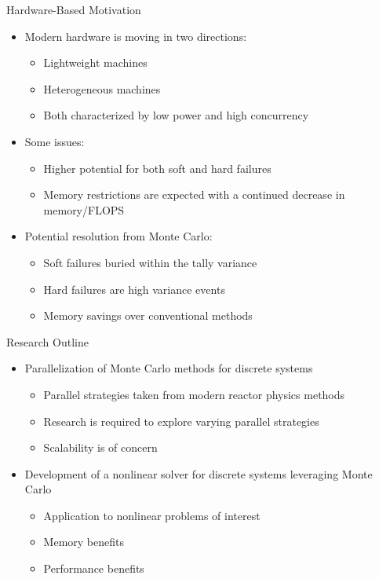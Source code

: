 \documentclass{beamer}
\begin{document}
\begin{frame}{Hardware-Based Motivation}

  \begin{itemize}
  \item Modern hardware is moving in two directions:
    \begin{itemize}
    \item Lightweight machines
    \item Heterogeneous machines
    \item Both characterized by low power and high concurrency
    \end{itemize}
  \item Some issues:
    \begin{itemize}
    \item Higher potential for both soft and hard failures
    \item Memory restrictions are expected with a continued decrease
      in memory/FLOPS
    \end{itemize}
  \item Potential resolution from Monte Carlo:
    \begin{itemize}
    \item Soft failures buried within the tally variance
    \item Hard failures are high variance events
    \item Memory savings over conventional methods
    \end{itemize}
  \end{itemize}

\end{frame}

\begin{frame}{Research Outline}
  \begin{itemize}
  \item Parallelization of Monte Carlo methods for discrete systems
    \begin{itemize}
    \item Parallel strategies taken from modern reactor physics
      methods
    \item Research is required to explore varying parallel strategies
    \item Scalability is of concern
    \end{itemize}
  \item Development of a nonlinear solver for discrete systems
    leveraging Monte Carlo
    \begin{itemize}
    \item Application to nonlinear problems of interest
    \item Memory benefits
    \item Performance benefits
    \end{itemize}
  \end{itemize}
\end{frame}
\end{document}

